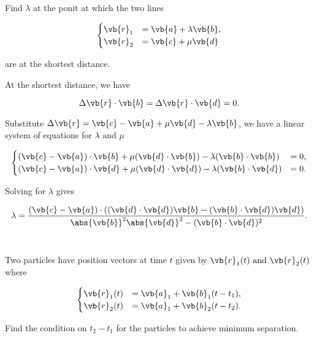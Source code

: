\documentclass[a4paper,12pt]{report}
\begin{document}
{Find \(\lambda \) at the ponit at which the two lines

\begin{equation}
    \begin{cases}
        \vb{r} _{1} &= \vb{a} + \lambda \vb{b},\\
        \vb{r} _{2} &= \vb{c} + \mu \vb{d}
    \end{cases}
\end{equation}

are at the shortest distance.
}
{At the shortest distance, we have 

\begin{equation}
    \Delta \vb{r} \cdot \vb{b} = \Delta \vb{r} \cdot \vb{d} = 0.
\end{equation}

Substitute \(\Delta \vb{r} = \vb{c} -\vb{a} +\mu \vb{d} -\lambda \vb{b} \), we have a linear system of equations for \(\lambda \text { and } \mu \)

\begin{equation}
    \begin{cases}
        (\vb{c} -\vb{a} ) \cdot \vb{b} + \mu (\vb{d} \cdot \vb{b} ) - \lambda (\vb{b} \cdot \vb{b} ) &= 0,\\
        (\vb{c} -\vb{a} ) \cdot \vb{d} + \mu (\vb{d} \cdot \vb{d} ) - \lambda (\vb{b} \cdot \vb{d} ) &= 0.
    \end{cases}
\end{equation}

Solving for \(\lambda \) gives 

\begin{equation}
    \lambda = \frac{(\vb{c} -\vb{a} ) \cdot \left( (\vb{d} \cdot \vb{d} )\vb{b} -(\vb{b} \cdot \vb{d} )\vb{d}  \right)}{\abs{\vb{b} }^2 \abs{\vb{d} }^2 - (\vb{b} \cdot \vb{d} )^2  }.
\end{equation}
~
} 


{Two particles have position vectors at time \(t\) given by \(\vb{r} _{1}(t) \text { and } \vb{r} _{2}(t) \) where

\begin{equation}
    \begin{cases}
        \vb{r} _{1}(t) &= \vb{a} _{1} + \vb{b} _{1}(t-t_1 ) ,\\
        \vb{r} _{2}(t) &= \vb{a} _{1} + \vb{b} _{2}(t-t_2 ).
    \end{cases}
\end{equation}

Find the condition on \(t_2 -t_1 \) for the particles to achieve minimum separation. 
}
{} 
\end{document}
